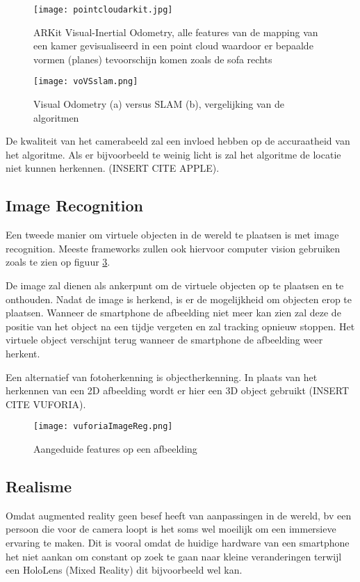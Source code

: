 \begin{figure}
    \texttt{[image: pointcloudarkit.jpg]}
    \caption{ARKit Visual-Inertial Odometry, alle features van de mapping van een kamer gevisualiseerd in een point cloud waardoor er bepaalde vormen (planes) tevoorschijn komen zoals de sofa rechts}
    \label{fig:pointcloudarkit}
\end{figure}

\begin{figure}
    \texttt{[image: voVSslam.png]}
    \caption{Visual Odometry (a) versus SLAM (b), vergelijking van de algoritmen \autocite{Yousif2015}}
    \label{fig:voVSslam}
\end{figure}


De kwaliteit van het camerabeeld zal een invloed hebben op de accuraatheid van het algoritme. Als er bijvoorbeeld te weinig licht is zal het algoritme de locatie niet kunnen herkennen. (INSERT CITE APPLE).

\subsection{Image Recognition}
Een tweede manier om virtuele objecten in de wereld te plaatsen is met image recognition. Meeste frameworks zullen ook hiervoor computer vision gebruiken zoals te zien op figuur \ref{fig:imagereg}.

De image zal dienen als ankerpunt om de virtuele objecten op te plaatsen en te onthouden. 
Nadat de image is herkend, is er de mogelijkheid om objecten erop te plaatsen. Wanneer de smartphone de afbeelding niet meer kan zien zal deze de positie van het object na een tijdje vergeten en zal tracking opnieuw stoppen. Het virtuele object verschijnt terug wanneer de smartphone de afbeelding weer herkent.

Een alternatief van fotoherkenning is objectherkenning. In plaats van het herkennen van een 2D afbeelding wordt er hier een 3D object gebruikt (INSERT CITE VUFORIA).

\begin{figure}
    \texttt{[image: vuforiaImageReg.png]}
    \caption{Aangeduide features op een afbeelding}
    \label{fig:imagereg}
\end{figure}

\subsection{Realisme}
Omdat augmented reality geen besef heeft van aanpassingen in de wereld, bv een persoon die voor de camera loopt is het soms wel moeilijk om een immersieve ervaring te maken. Dit is vooral omdat de huidige hardware van een smartphone het niet aankan om constant op zoek te gaan naar kleine veranderingen terwijl een HoloLens (Mixed Reality) dit bijvoorbeeld wel kan.

